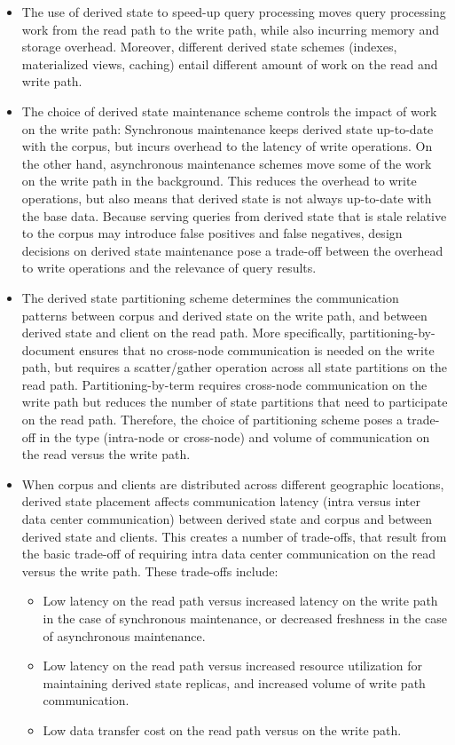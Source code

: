 \begin{itemize}
  \item The use of derived state to speed-up query processing moves query processing work from the read path to the write
  path, while also incurring memory and storage overhead.
  Moreover, different derived state schemes (indexes, materialized views, caching) entail different amount of work
  on the read and write path.

  \item The choice of derived state maintenance scheme controls the impact of work on the write path:
  Synchronous maintenance keeps derived state up-to-date with the corpus,
  but incurs overhead to the latency of write operations.
  On the other hand, asynchronous maintenance schemes move some of the work on the write path in the background.
  This reduces the overhead to write operations, but also means that derived state is not always up-to-date with the base
  data.
  Because serving queries from derived state that is stale relative to the corpus may introduce false positives and
  false negatives,
  design decisions on derived state maintenance pose a trade-off between the overhead to write operations
  and the relevance of query results.

  \item The derived state partitioning scheme determines the communication patterns between corpus and derived state
  on the write path, and between derived state and client on the read path.
  More specifically, partitioning-by-document ensures that no cross-node communication is needed on the write path,
  but requires a scatter/gather operation across all state partitions on the read path.
  Partitioning-by-term requires cross-node communication on the write path but reduces the number of state partitions
  that need to participate on the read path.
  Therefore, the choice of partitioning scheme poses a trade-off in the type (intra-node or cross-node) and volume
  of communication on the read versus the write path.

  \item When corpus and clients are distributed across different geographic locations,
  derived state placement affects communication latency (intra versus inter data center communication)
  between derived state and corpus and between derived state and clients.
  This creates a number of trade-offs, that result from the basic trade-off of requiring intra data center communication
  on the read versus the write path.
  These trade-offs include:
  \begin{itemize}
    \item Low latency on the read path versus increased latency on the write path in the case of synchronous maintenance,
    or decreased freshness in the case of asynchronous maintenance.
    \item Low latency on the read path versus increased resource utilization for maintaining derived state replicas,
    and increased volume of write path communication.
    \item Low data transfer cost on the read path versus on the write path.
  \end{itemize}

\end{itemize}